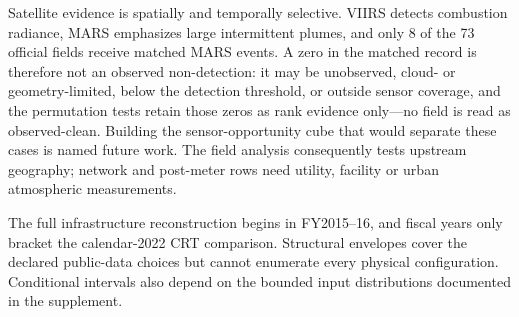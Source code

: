 Satellite evidence is spatially and temporally selective. VIIRS detects combustion radiance,
MARS emphasizes large intermittent plumes, and only \num{8} of the \num{73} official fields
receive matched MARS events. A zero in the matched record is therefore not an observed
non-detection: it may be unobserved, cloud- or geometry-limited, below the detection
threshold, or outside sensor coverage, and the permutation tests retain those zeros as
rank evidence only---no field is read as observed-clean. Building the sensor-opportunity
cube that would separate these cases is named future work. The field analysis
consequently tests upstream geography; network and post-meter rows
need utility, facility or urban atmospheric measurements.

The full infrastructure reconstruction begins in FY2015--16, and fiscal years only bracket the
calendar-2022 CRT comparison. Structural envelopes cover the declared public-data choices but
cannot enumerate every physical configuration. Conditional intervals also depend on the bounded
input distributions documented in the supplement.
